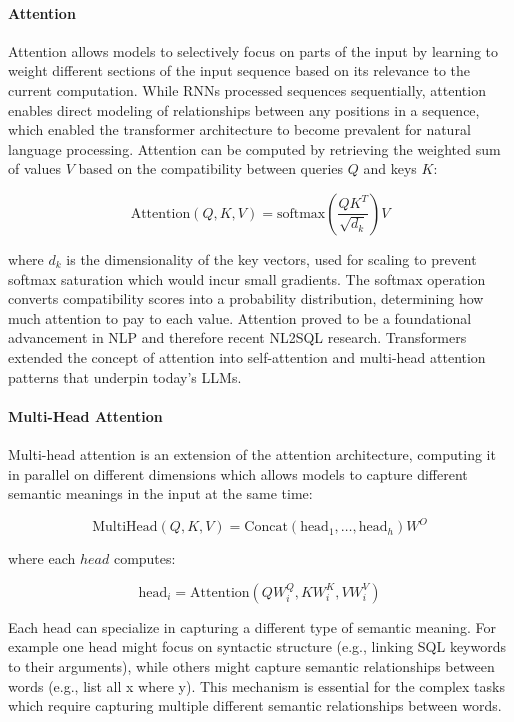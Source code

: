 \paragraph{Attention}

Attention allows models to selectively focus on parts of the input by learning
to weight different sections of the input sequence based on its relevance to
the current computation. While RNNs processed sequences sequentially, attention
enables direct modeling of relationships between any positions in a sequence,
which enabled the transformer architecture to become prevalent for natural
language processing. Attention can be computed by retrieving
the weighted sum of values $V$ based on the compatibility between queries $Q$
and keys $K$:

\begin{equation}
\text{Attention}(Q, K, V) = \text{softmax}\left(\frac{QK^T}{\sqrt{d_k}}\right)V
\end{equation}

where $d_k$ is the dimensionality of the key vectors, used for scaling to
prevent softmax saturation which would incur small gradients. The softmax
operation converts compatibility scores into a probability distribution,
determining how much attention to pay to each value. Attention proved to be
a foundational advancement in NLP and therefore recent NL2SQL research.
Transformers extended the concept of attention into self-attention and
multi-head attention patterns that underpin today's LLMs.

\paragraph{Multi-Head Attention}

Multi-head attention is an extension of the attention architecture, computing
it in parallel on different dimensions which allows models to capture different
semantic meanings in the input at the same time:

\begin{equation}
\text{MultiHead}(Q, K, V) = \text{Concat}(\text{head}_1, \ldots, \text{head}_h)W^O
\end{equation}

where each $head$ computes:

\begin{equation}
\text{head}_i = \text{Attention}(QW_i^Q, KW_i^K, VW_i^V)
\end{equation}

Each head can specialize in capturing a different type of semantic meaning. For
example one head might focus on syntactic structure (e.g., linking SQL keywords
to their arguments), while others might capture semantic relationships between
words (e.g., list all x where y). This mechanism is essential for the complex
tasks which require capturing multiple different semantic relationships between
words.
